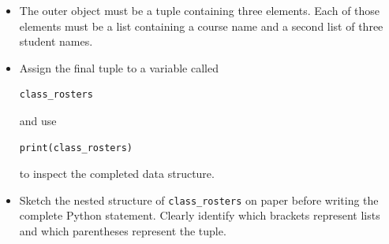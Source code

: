 \documentclass{article}
\begin{document}
\begin{enumerate}
\begin{itemize}
\begin{verbatim}
    [course2, [student1, student2,
               student3]],

    [course3, [student1, student2,
               student3]]
)
\end{verbatim}
\vspace{0.25cm}

\item The outer object must be a tuple containing three elements.  Each of those elements must be a list containing a course name and a second list of three student names. \\ \vspace{0.25cm}

\item Assign the final tuple to a variable called
\begin{verbatim}
class_rosters
\end{verbatim}
and use
\begin{verbatim}
print(class_rosters)
\end{verbatim}
to inspect the completed data structure. \\ \vspace{0.25cm}

\item Sketch the nested structure of \texttt{class\_rosters} on paper before writing the complete Python statement.  Clearly identify which brackets represent lists and which parentheses represent the tuple. \\ \vspace{0.5cm}

\end{itemize}
\end{enumerate}
\end{document}

